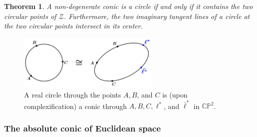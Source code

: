 \documentclass[10pt, a4paper]{article}
\theoremstyle{BoldTopSpacing}
\newtheorem{theorem}{Theorem}[section]
\theoremstyle{BoldTopSpacing}
\theoremstyle{BoldTopSpacing}
\theoremstyle{BoldTopBottomSpacing}
\theoremstyle{BoldTopSpacing}
\theoremstyle{BoldTopBottomSpacing}
\theoremstyle{remark}
\begin{document}
\begin{theorem}
\label{thm:conic-through-circular-points}
A non-degenerate conic is a circle if and only if it contains the two circular points of $\mathcal{Z}$. Furthermore, the two imaginary tangent lines of a circle at the two circular points intersect in its center.
\end{theorem}

\begin{figure}[H]
    \centering
    \includegraphics[width=0.6\textwidth]{three-points-determine-a-circle.png}
\caption[Circles are conics through the circular points at infinity.]{A real circle through the points $A, B$, and $C$ is (upon complexification) a conic through $A, B, C, \ell^{*}$, and $\bar{\ell}^{*}$ in $\mathbb{C}\mathbb{P}^2$.}
    \label{fig:three-points-determine-a-circle}
\end{figure}

\subsubsection{The absolute conic of Euclidean space}
\label{subsubsec:absolute-conic-three-dimensional}
\end{document}
